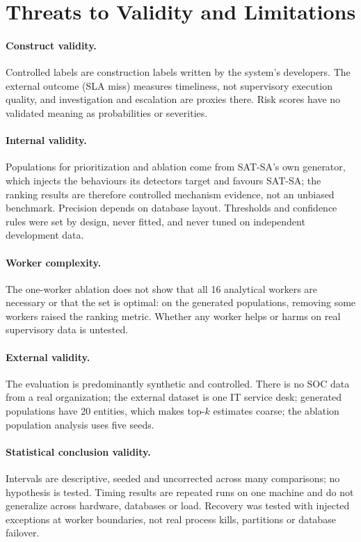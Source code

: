 \section{Threats to Validity and Limitations}
\label{sec:threats}

\paragraph{Construct validity.} Controlled labels are construction labels written by
the system's developers. The external outcome (SLA miss) measures timeliness, not
supervisory execution quality, and investigation and escalation are proxies there.
Risk scores have no validated meaning as probabilities or severities.

\paragraph{Internal validity.} Populations for prioritization and ablation come from
SAT-SA's own generator, which injects the behaviours its detectors target and favours
SAT-SA; the ranking results are therefore controlled mechanism evidence, not an
unbiased benchmark. Precision depends on database layout. Thresholds and confidence
rules were set by design, never fitted, and never tuned on independent development
data.

\paragraph{Worker complexity.} The one-worker ablation does not show that all
16 analytical workers are necessary or that the set is optimal: on the
generated populations, removing some workers raised the ranking metric. Whether any
worker helps or harms on real supervisory data is untested.

\paragraph{External validity.} The evaluation is predominantly synthetic and
controlled. There is no SOC data from a real organization; the external dataset is one
IT service desk; generated populations have 20 entities, which makes
top-$k$ estimates coarse; the ablation population analysis uses five seeds.

\paragraph{Statistical conclusion validity.} Intervals are descriptive, seeded and
uncorrected across many comparisons; no hypothesis is tested. Timing results are
repeated runs on one machine and do not generalize across hardware, databases or load.
Recovery was tested with injected exceptions at worker boundaries, not real process
kills, partitions or database failover.


